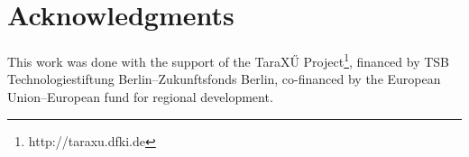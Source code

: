 \documentclass[11pt]{article}
\begin{document}
\section*{Acknowledgments}
This work was done with the support of the TaraX\H{U}
Project\footnote{http://taraxu.dfki.de}, 
financed by TSB Techno\-logie\-stiftung Berlin--Zukunftsfonds Berlin,
co-financed by the European Union--European fund for regional development. 

 
 

%  
% 
% 
% 
% 
% 
\end{document}
